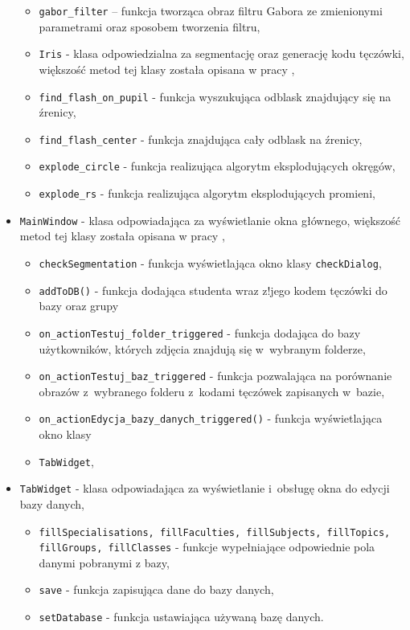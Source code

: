 \begin{itemize}
\begin{itemize}
\item \verb!gabor_filter! – funkcja tworząca obraz filtru Gabora ze zmienionymi parametrami oraz sposobem tworzenia filtru,
\end{itemize}
\begin{itemize}
\item \verb!Iris! - klasa odpowiedzialna za segmentację oraz generację kodu tęczówki, większość metod tej klasy została opisana w pracy \cite{Gl11},
\end{itemize}
\begin{itemize}
\item \verb!find_flash_on_pupil! - funkcja wyszukująca odblask znajdujący się na źrenicy,
\item \verb!find_flash_center! - funkcja znajdująca cały odblask na źrenicy,
\item \verb!explode_circle! - funkcja realizująca algorytm eksplodujących okręgów,
\item \verb!explode_rs! - funkcja realizująca algorytm eksplodujących promieni,
\end{itemize}
\item \verb!MainWindow! - klasa odpowiadająca za wyświetlanie okna głównego, większość metod tej klasy została opisana w pracy \cite{Gl11},
\begin{itemize}
\item \verb!checkSegmentation! - funkcja wyświetlająca okno klasy \verb!checkDialog!,
\item \verb!addToDB()! - funkcja dodająca studenta wraz z!jego kodem tęczówki do bazy oraz grupy
\item \verb!on_actionTestuj_folder_triggered! - funkcja dodająca do bazy użytkowników, których zdjęcia znajdują się w~wybranym folderze,
\item \verb!on_actionTestuj_baz_triggered! - funkcja pozwalająca na porównanie obrazów z~wybranego folderu z~kodami tęczówek zapisanych w~bazie,
\item \verb!on_actionEdycja_bazy_danych_triggered()! - funkcja wyświetlająca okno klasy \item \verb!TabWidget!,
\end{itemize}
\item \verb!TabWidget! - klasa odpowiadająca za wyświetlanie i~obsługę okna do edycji bazy danych,
\begin{itemize}
\item \verb!fillSpecialisations, fillFaculties, fillSubjects, fillTopics, fillGroups, fillClasses! - funkcje wypełniające odpowiednie pola danymi pobranymi z bazy,
\item \verb!save! - funkcja zapisująca dane do bazy danych,
\item \verb!setDatabase! - funkcja ustawiająca używaną bazę danych.
\end{itemize}
\end{itemize}

